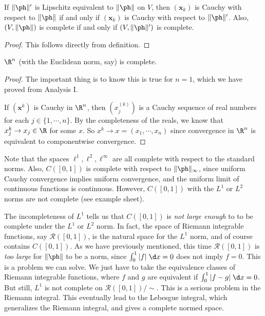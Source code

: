 \documentclass[a4paper]{article}
\begin{document}
\begin{prop}
  If $\|\ph \|'$ is Lipschitz equivalent to $\|\ph\|$ on $V$, then $(\mathbf{x}_k)$ is Cauchy with respect to  $\|\ph \|$ if and only if $(\mathbf{x}_k)$ is Cauchy with respect to $\|\ph\|'$. Also, $(V, \|\ph\|)$ is complete if and only if $(V, \|\ph\|')$ is complete.
\end{prop}

\begin{proof}
  This follows directly from definition.
\end{proof}

\begin{thm}[]
  $\R^n$ (with the Euclidean norm, say) is complete.
\end{thm}

\begin{proof}
  The important thing is to know this is true for $n = 1$, which we have proved from Analysis I.

  If $(\mathbf{x}^k)$ is Cauchy in $\R^n$, then $(x_j^{(k)})$ is a Cauchy sequence of real numbers for each $j \in \{1, \cdots, n\}$. By the completeness of the reals,  we know that $x_j^k \to x_j \in \R$ for some $x$. So $x^k \to x = (x_1, \cdots, x_n)$ since convergence in $\R^n$ is equivalent to componentwise convergence.
\end{proof}
Note that the spaces $\ell^1, \ell^2, \ell^\infty$ are all complete with respect to the standard norms. Also, $C([0, 1])$ is complete with respect to $\|\ph\|_\infty$, since uniform Cauchy convergence implies uniform convergence, and the uniform limit of continuous functions is continuous. However, $C([0, 1])$ with the $L^1$ or $L^2$ norms are not complete (see example sheet).

The incompleteness of $L^1$ tells us that $C([0, 1])$ is \emph{not large enough} to to be complete under the $L^1$ or $L^2$ norm. In fact, the space of Riemann integrable functions, say $\mathcal{R}([0, 1])$, is the natural space for the $L^1$ norm, and of course contains $C([0, 1])$. As we have previously mentioned, this time $\mathcal{R}([0, 1])$ is \emph{too large} for $\|\ph\|$ to be a norm, since $\int_0^1 |f|\;\d x = 0$ does not imply $f = 0$. This is a problem we can solve. We just have to take the equivalence classes of Riemann integrable functions, where $f$ and $g$ are equivalent if $\int_0^1 |f - g|\;\d x = 0$. But still, $L^1$ is not complete on $\mathcal{R}([0, 1])/{\sim}$. This is a serious problem in the Riemann integral. This eventually lead to the Lebesgue integral, which generalizes the Riemann integral, and gives a complete normed space.
\end{document}
